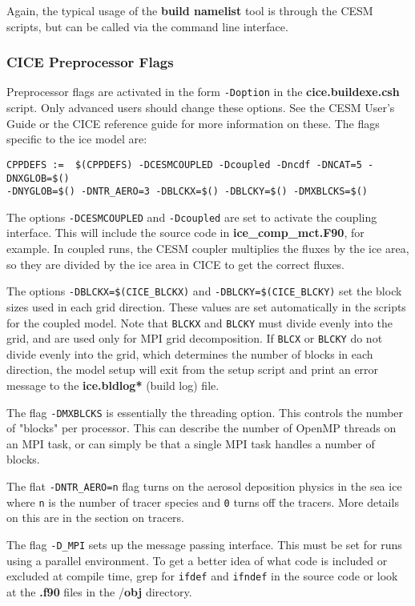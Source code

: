 Again, the typical usage of the \textbf{build namelist} tool is through
the CESM scripts, but can be called via the command line interface.

\subsubsection{CICE Preprocessor Flags}

Preprocessor flags are activated in the form {\tt -Doption} in the 
{\bf cice.buildexe.csh} script.  Only advanced users should change
these options.  See the CESM User's Guide or the CICE reference guide
for more information on these.  The flags specific to the ice model are:

\begin{verbatim}
CPPDEFS :=  $(CPPDEFS) -DCESMCOUPLED -Dcoupled -Dncdf -DNCAT=5 -DNXGLOB=$()
-DNYGLOB=$() -DNTR_AERO=3 -DBLCKX=$() -DBLCKY=$() -DMXBLCKS=$()
\end{verbatim}

The options {\tt -DCESMCOUPLED} and  {\tt -Dcoupled} are set to activate the 
coupling interface.  This will include the source code in 
{\bf ice\_comp\_mct.F90}, for example.  In coupled runs, the CESM coupler 
multiplies the fluxes by the ice area, so they are divided by the ice area 
in CICE to get the correct fluxes.

The options {\tt -DBLCKX=\$(CICE\_BLCKX)} and {\tt -DBLCKY=\$(CICE\_BLCKY)} 
set the block sizes used in each grid direction.  These values are 
set automatically in the scripts for the coupled model.  Note that {\tt BLCKX} 
and {\tt BLCKY} must divide evenly into the grid, and are used only for MPI 
grid decomposition.  If {\tt BLCX} or {\tt BLCKY} do not divide evenly into 
the grid, which determines the number of blocks in each direction, the model 
setup will exit from the setup script and print an error message to the 
{\bf ice.bldlog*} (build log) file.

The flag {\tt -DMXBLCKS} is essentially the threading option. This controls
the number of "blocks" per processor. This can describe the number of OpenMP
threads on an MPI task, or can simply be that a single MPI task handles
a number of blocks.

The flat {\tt -DNTR\_AERO=n} flag turns on the aerosol deposition physics in
the sea ice where {\tt n} is the number of tracer species and {\tt 0} turns
off the tracers. More details on this are in the section on tracers. 

The flag {\tt -D\_MPI} sets up the message passing interface.  This must be set
for runs using a parallel environment.  To get a better idea of what code
is included or excluded at compile time, grep for {\tt ifdef} and {\tt ifndef}
in the source code or look at the {\bf *.f90} files in the /{\bf obj} directory.

